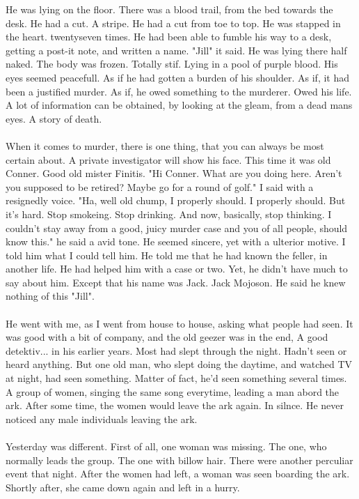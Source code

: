 \documentclass[]{article}
\begin{document}
He was lying on the floor. There was a blood trail, from the bed towards the desk. He had a cut. A stripe. He had a cut from toe to top. He was stapped in the heart. twentyseven times. He had been able to fumble his way to a desk, getting a post-it note, and written a name. "Jill" it said. He was lying there half naked. The body was frozen. Totally stif. Lying in a pool of purple blood. His eyes seemed peacefull. As if he had gotten a burden of his shoulder. As if, it had been a justified murder. As if, he owed something to the murderer. Owed his life. A lot of information can be obtained, by looking at the gleam, from a dead mans eyes. A story of death.
\\ \\
When it comes to murder, there is one thing, that you can always be most certain about. A private investigator will show his face. This time it was old Conner. Good old mister Finitis. "Hi Conner. What are you doing here. Aren't you supposed to be retired? Maybe go for a round of golf." I said with a resignedly voice. "Ha, well old chump, I properly should. I properly should. But it's hard. Stop smokeing. Stop drinking. And now, basically, stop thinking. I couldn't stay away from a good, juicy murder case and you of all people, should know this." he said a avid tone. He seemed sincere, yet with a ulterior motive. I told him what I could tell him. He told me that he had known the feller, in another life. He had helped him with a case or two. Yet, he didn't have much to say about him. Except that his name was Jack. Jack Mojoson. He said he knew nothing of this "Jill".
\\ \\
He went with me, as I went from house to house, asking what people had seen. It was good with a bit of company, and the old geezer was in the end, A good detektiv... in his earlier years. Most had slept through the night. Hadn't seen or heard anything. But one old man, who slept doing the daytime, and watched TV at night, had seen something. Matter of fact, he'd seen something several times. A group of women, singing the same song everytime, leading a man abord the ark. After some time, the women would leave the ark again. In silnce. He never noticed any male individuals leaving the ark.
\\ \\
Yesterday was different. First of all, one woman was missing. The one, who normally leads the group. The one with billow hair. There were another perculiar event that night. After the women had left, a woman was seen boarding the ark. Shortly after, she came down again and left in a hurry. 
\end{document}
